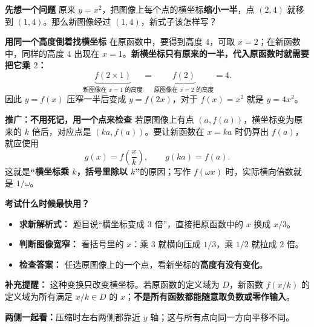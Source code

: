 \begin{explanationbox}
  \textbf{\textcolor{CExplanation}{先想一个问题}}
  原来 $y=x^2$，把图像上每个点的横坐标\textbf{缩小一半}，点 $(2,4)$ 就移到 $(1,4)$。那么新图像经过 $(1,4)$，新式子该怎样写？

  \medskip
  \textbf{\textcolor{CExplanation}{用同一个高度倒着找横坐标}}
  在原函数中，要得到高度 $4$，可取 $x=2$；在新函数中，同样的高度 $4$ 出现在 $x=1$。\textbf{新横坐标只有原来的一半，代入原函数时就需要把它乘 $2$：}
  \[
    \underbrace{f(2\times 1)}_{\text{新图像在 }x=1\text{ 的高度}}
    =\underbrace{f(2)}_{\text{原图像在 }x=2\text{ 的高度}}=4.
  \]
  因此 $y=f(x)$ 压窄一半后变成 $y=f(2x)$，对于 $f(x)=x^2$ 就是 $y=4x^2$。

  \begin{center}
  
  \end{center}

  \textbf{\textcolor{CExplanation}{推广：不用死记，用一个点来检查}}
  若原图像上有点 $(a,f(a))$，横坐标变为原来的 $k$ 倍后，对应点是 $(ka,f(a))$。要让新函数在 $x=ka$ 时仍算出 $f(a)$，就应使用
  \[
     g(x)=f\!\left(\frac{x}{k}\right),\qquad
     g(ka)=f(a).
  \]
  这就是\textbf{“横坐标乘 $k$，括号里除以 $k$”}的原因；写作 $f(\omega x)$ 时，实际横向倍数就是 $1/\omega$。

  \medskip
  \textbf{\textcolor{CExplanation}{考试什么时候最快用？}}
  \begin{itemize}[leftmargin=*,itemsep=0.3em,topsep=0.3em]
    \item \textbf{求新解析式：} 题目说“横坐标变成 $3$ 倍”，直接把原函数中的 $x$ 换成 $x/3$。
    \item \textbf{判断图像宽窄：} 看括号里的 $x$：乘 $3$ 就横向压成 $1/3$，乘 $1/2$ 就拉成 $2$ 倍。
    \item \textbf{检查答案：} 任选原图像上的一个点，看新坐标的\textbf{高度有没有变化}。
  \end{itemize}
  \textbf{补充提醒：} 这种变换只改变横坐标。若原函数的定义域为 $D$，新函数 $f(x/k)$ 的定义域为所有满足 $x/k\in D$ 的 $x$；\textbf{不是所有函数都能随意取负数或零作输入}。
\begin{center}

\end{center}
\textbf{两侧一起看：}压缩时左右两侧都靠近 $y$ 轴；这与所有点向同一方向平移不同。
\end{explanationbox}
